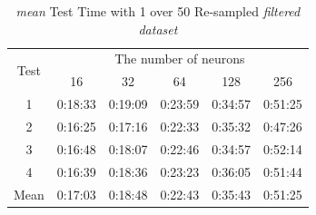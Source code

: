 \documentclass[draft,dvipsnames]{drexel-thesis}
\begin{document}
\begin{thesis}
\begin{table}[!t]
\centering
\caption{{\em mean} Test Time with 1 over 50 Re-sampled {\em filtered dataset}}
\label{tbl:mean_1_50_time}
\begin{tabular}{|c|c|c|c|c|c|}
\hline
\multirow{2}{*}{Test}      & \multicolumn{5}{c|}{The number of neurons}                                                                                                               \\ \cline{2-6}
                           & 16                           & 32                           & 64                           & 128                          & 256                          \\ \hline
1                          & 0:18:33                      & 0:19:09                      & 0:23:59                      & 0:34:57                      & 0:51:25                      \\ \hline
2                          & 0:16:25                      & 0:17:16                      & 0:22:33                      & 0:35:32                      & 0:47:26                      \\ \hline
3                          & 0:16:48                      & 0:18:07                      & 0:22:46                      & 0:34:57                      & 0:52:14                      \\ \hline
4                          & 0:16:39                      & 0:18:36                      & 0:23:23                      & 0:36:05                      & 0:51:44                      \\ \hline
\multicolumn{1}{|l|}{Mean} & \multicolumn{1}{l|}{0:17:03} & \multicolumn{1}{l|}{0:18:48} & \multicolumn{1}{l|}{0:22:43} & \multicolumn{1}{l|}{0:35:43} & \multicolumn{1}{l|}{0:51:25} \\ \hline
\end{tabular}
\end{table}


\end{thesis}
\end{document}
